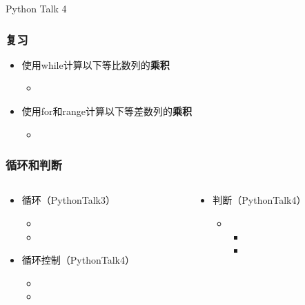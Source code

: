 



\PreFirstFrame
\begin{frame} [fragile]
	\centerline{\fontsize{42}{42}\selectfont Python Talk 4}
\end{frame}
\PostFirstFrame

\begin{frame} [fragile]
	\frametitle{复习}
	\linespread{1.5}
	\begin{itemize}
	\item 使用while计算以下等比数列的\textbf{乘积}
		\begin{itemize}
		\item {}
		\end{itemize}
	\item 使用for和range计算以下等差数列的\textbf{乘积}
		\begin{itemize}
		\item {}
		\end{itemize}
	\end{itemize}
\end{frame}

\begin{frame} [fragile]
	\frametitle{循环和判断}
	\linespread{2}
	\begin{columns}[T]
		\begin{column}[T]{.5\textwidth}
			\begin{itemize}
			\item 循环（PythonTalk3）
				\begin{itemize}
				\item {}
				\item {}
				\end{itemize}
			\item 循环控制（PythonTalk4）
				\begin{itemize}
				\item {}
				\item {}
				\end{itemize}
			\end{itemize}
		\end{column}
		\begin{column}[T]{.5\textwidth}
			\begin{itemize}
			\item 判断（PythonTalk4）
				\begin{itemize}
				\item {}
					\begin{itemize}
					\item {}
					\item {}
					\end{itemize}
				\end{itemize}
			\end{itemize}
		\end{column}
	\end{columns}
\end{frame}

